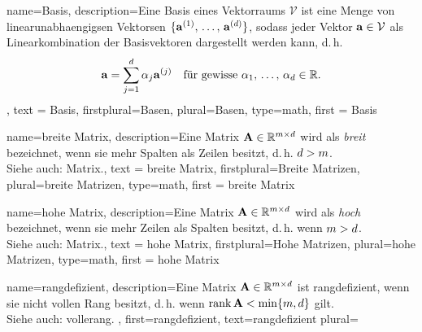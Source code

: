 {
  name={Basis},
  description={Eine Basis\cite{Soergel201x_AlgebraMitBildern} eines \gls{Vektorraums} $\mathcal{V}$ 
  ist eine Menge von \glspl{linearunabhaengig}en \glspl{Vektor}en 
  $\{{\bf a}^{(1)}, \,\ldots, \,{\bf a}^{(d)}\}$, 
  sodass jeder Vektor ${\bf a} \in \mathcal{V}$ als Linearkombination 
  der Basisvektoren dargestellt werden kann, d.\,h.
  $$
    {\bf a} = \sum_{j=1}^{d} \alpha_{j} {\bf a}^{(j)} 
    \quad \text{für gewisse } \alpha_{1}, \,\ldots, \,\alpha_{d} \in \mathbb{R}.
  $$
  },
  text = {Basis}, 
  firstplural={Basen}, 
  plural={Basen}, 
  type=math,
  first = {Basis}
}


{
  name={breite Matrix},
  description={Eine \gls{Matrix} 
  ${\bf A} \in \mathbb{R}^{m \times d}$ 
  wird als \emph{breit} bezeichnet, wenn sie mehr Spalten als Zeilen besitzt, 
  d.\,h. $d > m$.\\ 
  Siehe auch: \gls{Matrix}.},
  text = {breite Matrix}, 
  firstplural={Breite Matrizen}, 
  plural={breite Matrizen}, 
  type=math,
  first = {breite Matrix}
}

{
  name={hohe Matrix},
  description={Eine \gls{Matrix} 
  ${\bf A} \in \mathbb{R}^{m \times d}$ 
  wird als \emph{hoch} bezeichnet, wenn sie mehr Zeilen als Spalten besitzt, 
  d.\,h. wenn $m > d$.\\ 
  Siehe auch: \gls{Matrix}.},
  text = {hohe Matrix}, 
  firstplural={Hohe Matrizen}, 
  plural={hohe Matrizen}, 
  type=math,
  first = {hohe Matrix}
}


{
  name={rangdefizient},
  description={Eine \gls{Matrix} ${\bf A} \in \mathbb{R}^{m \times d}$ 
   ist  rangdefizient\cite{Krause2021}, wenn sie nicht vollen Rang besitzt, 
  d.\,h. wenn $\operatorname*{rank}{{\bf A}} < \min\{m, d\}$ gilt.\\
  Siehe auch: \gls{vollerang}. 
  }, 
  first={rangdefizient}, 
  text={rangdefizient}
  plural= 
}

